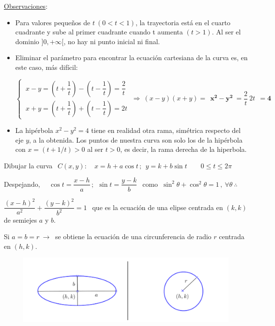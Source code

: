 \underline{Observaciones}:
\begin{itemize}
\item Para valores pequeños de $t \ (0<t<1)$, la trayectoria está en el cuarto cuadrante y sube al primer cuadrante cuando t aumenta $(t>1)$. Al ser el dominio $]0,+\infty[$, no hay ni punto inicial ni final.
\item Eliminar el parámetro para encontrar la ecuación cartesiana de la curva es, en este caso, más difícil:

\vspace{3mm}
$\begin{cases} 
	\ x-y=\left( t+\dfrac 1 t \right) - \left( t-\dfrac 1 t \right)=\dfrac 2 t \\ 
	\  x+y=\left( t+\dfrac 1 t \right) + \left( t-\dfrac 1 t \right)=2 t 
\end{cases} \ \Rightarrow \ (x-y)(x+y)= \ \boxed{ \ \boldsymbol{x^2-y^2} \ } = \dfrac 2 t \ 2t \ \boxed { \ \boldsymbol{=4} \ }$
\vspace{3mm}

\item La hipérbola $x^2-y^2=4$ tiene en realidad otra rama, simétrica respecto del eje $y$, a la obtenida. Los puntos de nuestra curva son solo los de la hipérbola con $x=(t+1/t)>0$ al ser $t>0$, es decir, la rama derecha de la hiperbola. 
\end{itemize}

\vspace{10mm}

\begin{mipropuesto}

Dibujar la curva $\ \ C(x,y):\quad x=h+a\cos t\, ; \ \ y=k+b\sin t \qquad 0\le t\le 2\pi$	

\end{mipropuesto}


Despejando, $\quad \cos t= \dfrac{x-h}{a}\, ; \ \ \sin t= \dfrac{y-k}{b} \ \ \text { como } \ \sin^2\theta + \cos^2 \theta = 1\, , \ \forall \theta \ \therefore$

$ \dfrac{(x-h)^2}{a^2}+\dfrac{(y-k)^2}{b^2}=1 \ \ $ que es la ecuación de una elipse centrada en $(k,k)$ de semiejes $a$ y $b$.

Si $a=b=r \ \to \ $ se obtiene la ecuación de una circunferencia de radio $r$ centrada en $(h,k)$.

\begin{figure}[H]
	\centering
	\includegraphics[width=.6\textwidth]{img-polares/polares06.png}
	\end{figure}

